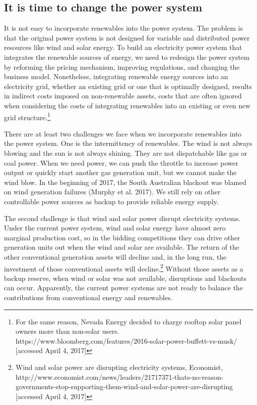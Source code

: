 \subsection{It is time to change the power
system}\label{it-is-time-to-change-the-power-system}

It is not easy to incorporate renewables into the power system. The
problem is that the original power system is not designed for variable
and distributed power resources like wind and solar energy. To build an
electricity power system that integrates the renewable sources of
energy, we need to redesign the power system by reforming the pricing
mechanism, improving regulations, and changing the business model.
Nonetheless, integrating renewable energy sources into an electricity
grid, whether an existing grid or one that is optimally designed,
results in indirect costs imposed on non-renewable assets, costs that
are often ignored when considering the costs of integrating renewables
into an existing or even new grid structure.\footnote{For the same
  reason, Nevada Energy decided to charge rooftop solar panel owners
  more than non-solar users.
  https://www.bloomberg.com/features/2016-solar-power-buffett-vs-musk/
  {[}accessed April 4, 2017{]}}

There are at least two challenges we face when we incorporate renewables
into the power system. One is the intermittency of renewables. The wind
is not always blowing and the sun is not always shining. They are not
dispatchable like gas or coal power. When we need power, we can push the
throttle to increase power output or quickly start another gas
generation unit, but we cannot make the wind blow. In the beginning of
2017, the South Australian blackout was blamed on wind generation
failures (Murphy et al. 2017). We still rely on other controllable power
sources as backup to provide reliable energy supply.

The second challenge is that wind and solar power disrupt electricity
systems. Under the current power system, wind and solar energy have
almost zero marginal production cost, so in the bidding competitions
they can drive other generation units out when the wind and solar are
available. The return of the other conventional generation assets will
decline and, in the long run, the investment of those conventional
assets will decline.\footnote{Wind and solar power are disrupting
  electricity systems, Economist,
  http://www.economist.com/news/leaders/21717371-thats-no-reason-governments-stop-supporting-them-wind-and-solar-power-are-disrupting
  {[}accessed April 4, 2017{]}} Without those assets as a backup
reserve, when wind or solar was not available, disruptions and blackouts
can occur. Apparently, the current power systems are not ready to
balance the contributions from conventional energy and renewables.

